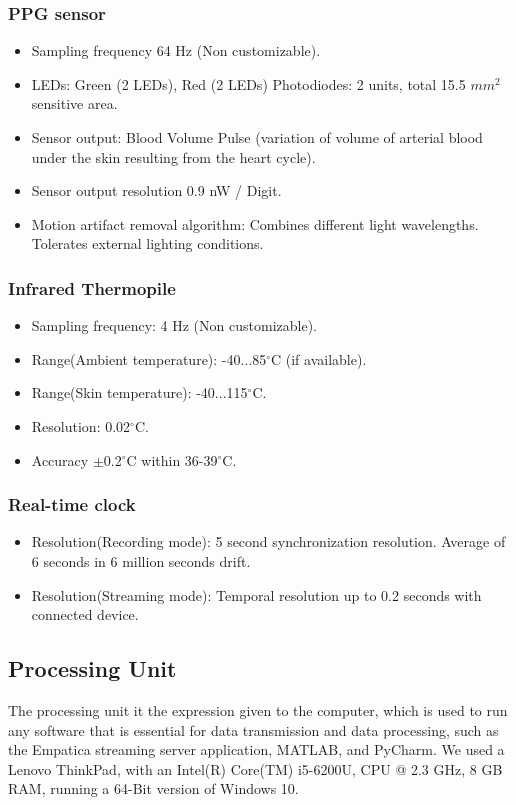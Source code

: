 \subsubsection{PPG sensor}
\begin{itemize}
\item Sampling frequency 64 Hz (Non customizable).
\item LEDs: Green (2 LEDs), Red (2 LEDs) Photodiodes: 2
units, total 15.5 $mm^{2}$ sensitive area.
\item Sensor output: Blood Volume Pulse (variation
of volume of arterial blood under the skin resulting
from the heart cycle).
\item Sensor output resolution 0.9 nW / Digit.
\item Motion artifact removal algorithm: Combines different light wavelengths. Tolerates external lighting conditions.
\end{itemize}
\newpage
\subsubsection{Infrared Thermopile}
\begin{itemize}
\item Sampling frequency: 4 Hz (Non customizable).
\item Range(Ambient temperature): -40...85$^{\circ}$C (if available).
\item Range(Skin temperature): -40...115$^{\circ}$C.
\item Resolution: 0.02$^{\circ}$C.
\item Accuracy $\pm$0.2$^{\circ}$C within 36-39$^{\circ}$C.
\end{itemize}

\subsubsection{Real-time clock}
\begin{itemize}
\item Resolution(Recording mode): 5 second synchronization resolution. Average of 6 seconds in 6 million seconds drift.
\item Resolution(Streaming mode): Temporal resolution up to 0.2 seconds with connected device.
\end{itemize}

\subsection{Processing Unit}
The processing unit it the expression given to the computer, which is used to run any software that is essential for data transmission and data processing, such as the Empatica streaming server application, MATLAB, and PyCharm. We used a Lenovo ThinkPad, with an Intel(R) Core(TM) i5-6200U, CPU @ 2.3 GHz, 8 GB RAM, running a 64-Bit version of Windows 10. 

